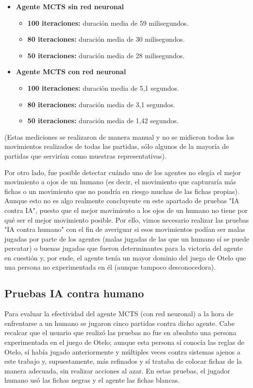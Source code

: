 \documentclass[conference]{IEEEtran}
\begin{document}
\begin{itemize}
    \item \textbf{Agente MCTS sin red neuronal}
    \begin{itemize}
    	\item \textbf{100 iteraciones:} duración media de 59 milisegundos.
    	\item \textbf{80 iteraciones:} duración media de 30 milisegundos.
	\item \textbf{50 iteraciones:} duración media de 28 milisegundos.
    \end{itemize}
    \item \textbf{Agente MCTS con red neuronal}
    \begin{itemize}
    	\item \textbf{100 iteraciones:} duración media de 5,1 segundos.
    	\item \textbf{80 iteraciones:} duración media de 3,1 segundos.
	\item \textbf{50 iteraciones:} duración media de 1,42 segundos.
    \end{itemize}
\end{itemize}

(Estas mediciones se realizaron de manera manual y no se midieron todos los movimientos realizados de todas las partidas, sólo algunos de la mayoría de partidas que servirían como muestras representativas).

Por otro lado, fue posible detectar cuándo uno de los agentes no elegía el mejor movimiento a ojos de un humano (es decir, el movimiento que capturaría más fichas o un movimiento que no pondría en riesgo muchas de las fichas propias). Aunque esto no es algo realmente concluyente en este apartado de pruebas "IA contra IA", puesto que el mejor movimiento a los ojos de un humano no tiene por qué ser el mejor movimiento posible. Por ello, vimos necesario realizar las pruebas "IA contra humano" con el fin de averiguar si esos movimientos podían ser malas jugadas por parte de los agentes (malas jugadas de las que un humano sí se puede percatar) o buenas jugadas que fueron determinantes para la victoria del agente en cuestión y, por ende, el agente tenía un mayor dominio del juego de Otelo que una persona no experimentada en él (aunque tampoco desconocedora).

\subsection{Pruebas IA contra humano}
Para evaluar la efectividad del agente MCTS (con red neuronal) a la hora de enfrentarse a un humano se jugaron cinco partidas contra dicho agente. Cabe recalcar que el usuario que realizó las pruebas no fue en absoluto una persona experimentada en el juego de Otelo; aunque esta persona sí conocía las reglas de Otelo, sí había jugado anteriormente y múltiples veces contra sistemas ajenos a este trabajo y, supuestamente, más refinados y sí trataba de colocar fichas de la manera adecuada, sin realizar acciones al azar. En estas pruebas, el jugador humano usó las fichas negras y el agente las fichas blancas.
\end{document}
